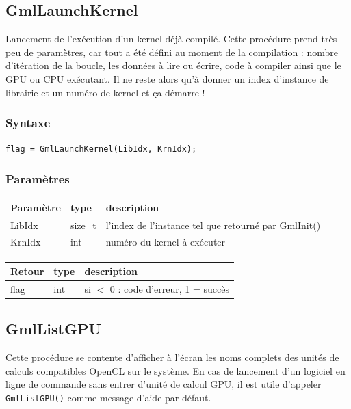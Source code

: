 \documentclass[a4paper,12pt]{article}
\begin{document}
\subsection{GmlLaunchKernel}

Lancement de l'exécution d'un kernel déjà compilé.
Cette procédure prend très peu de paramètres, car tout a été défini au moment de la compilation : nombre d'itération de la boucle, les données à lire ou écrire, code à compiler ainsi que le GPU ou CPU exécutant.
Il ne reste alors qu'à donner un index d'instance de librairie et un numéro de kernel et ça démarre !

\subsubsection*{Syntaxe}

{\tt flag = GmlLaunchKernel(LibIdx, KrnIdx);}

\subsubsection*{Paramètres}

\begin{tabular}{|m{2cm}|m{1.5cm}|m{10.5cm}|}
\hline
Paramètre  & type    & description \\
\hline
LibIdx     & size\_t & l'index de l'instance tel que retourné par GmlInit() \\
\hline
KrnIdx     & int     & numéro du kernel à exécuter \\
\hline
\end{tabular}

\medskip

\begin{tabular}{|m{2cm}|m{1.5cm}|m{10.5cm}|}
\hline
Retour     & type    & description \\
\hline
flag       & int     & si $<$ 0 : code d'erreur, 1 = succès \\
\hline
\end{tabular}


\subsection{GmlListGPU}

Cette procédure se contente d'afficher à l'écran les noms complets des unités de calculs compatibles OpenCL sur le système.
En cas de lancement d'un logiciel en ligne de commande sans entrer d'unité de calcul GPU, il est utile d'appeler {\tt GmlListGPU()} comme message d'aide par défaut.
\end{document}
